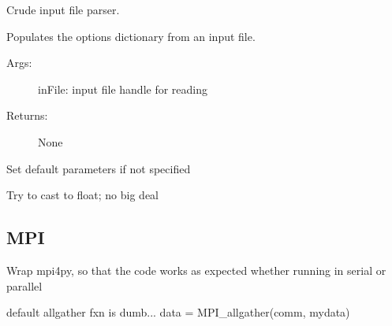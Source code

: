 \documentclass[letterpaper,10pt,english]{sphinxmanual}
\begin{document}
\begin{fulllineitems}
\label{\detokenize{globals:Globals.params.parse}}
Crude input file parser.

Populates the \sphinxquotedblleft{}options\sphinxquotedblright{} dictionary from an input file.
\begin{description}
\item[{Args:}] \leavevmode
inFile: input file handle for reading

\item[{Returns:}] \leavevmode
None

\end{description}

\end{fulllineitems}


\begin{fulllineitems}
\label{\detokenize{globals:Globals.params.set_defaults}}
Set default parameters if not specified

\end{fulllineitems}


\begin{fulllineitems}
\label{\detokenize{globals:Globals.params.tryFloat}}
Try to cast to float; no big deal

\end{fulllineitems}



\subsection{MPI}
\label{\detokenize{globals:mpi}}\label{\detokenize{globals:module-Globals.MPI}}
Wrap mpi4py, so that the code works as expected whether running in serial
or parallel

\begin{fulllineitems}
\label{\detokenize{globals:Globals.MPI.allgather}}
default allgather fxn is dumb...
data = MPI\_allgather(comm, mydata)

\end{fulllineitems}
\end{document}
